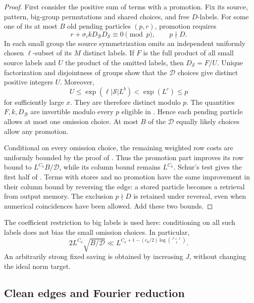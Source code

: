 \begin{proof}
First consider the positive sum of terms with a promotion.
Fix its source, pattern, big-group permutations and shared
choices, and free $D$-labels.  For some one of its at most
$B$ old pending particles $(p,r)$, promotion requires
\begin{equation}\label{eq:promotion-congruence}
 r+\sigma_i kD_{\mathcal B}D_{\mathcal S}\equiv0\pmod p,
 \qquad p\nmid D.
\end{equation}
In each small group the source symmetrization omits an
independent uniformly chosen $\ell$-subset of its $M$
distinct labels.  If $F$ is the full product of all small
source labels and $U$ the product of the omitted labels,
then $D_{\mathcal S}=F/U$.  Unique factorization and
disjointness of groups show that the $\mathcal D$ choices
give distinct positive integers $U$.  Moreover,
\[
 U\le\exp(\ell|\mathcal S|L^b)<\exp(L^c)\le p
\]
for sufficiently large $x$.  They are therefore distinct
modulo $p$.  The quantities $F,k,D_{\mathcal B}$ are
invertible modulo every $p$ eligible in
.  Hence each pending particle
allows at most one omission choice.  At most $B$ of the
$\mathcal D$ equally likely choices allow any promotion.

Conditional on every omission choice, the remaining weighted
row costs are uniformly bounded by the proof of
.  Thus the promotion part improves
its row bound to $L^{C_a}B/\mathcal D$, while its column
bound remains $L^{C_a}$.  Schur's test gives the first half
of .  Terms with stores and no promotion
have the same improvement in their column bound by reversing
the edge: a stored particle becomes a retrieval from output
memory.  The exclusion $p\nmid D$ is retained under reversal,
even when numerical coincidences have been allowed.  Add
these two bounds.
\end{proof}

The coefficient restriction to big labels is used here:
conditioning on all such labels does not bias the small
omission choices.  In particular,
\begin{equation}\label{eq:dirty-J-gain}
 2L^{C_a}\sqrt{B/\mathcal D}
 \ll L^{C_a+1-(c_0/2)\log\binom{J+\ell}{\ell}}.
\end{equation}
An arbitrarily strong fixed saving is obtained by increasing
$J$, without changing the ideal norm target.

\subsection{Clean edges and Fourier reduction}

